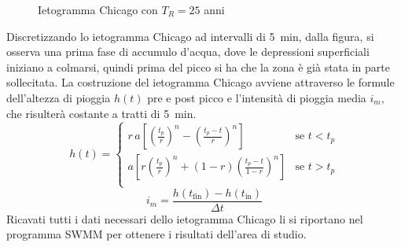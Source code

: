 \begin{figure}[htb]
    \centering
    \caption{Ietogramma Chicago con $T_R = 25$ anni}
    \label{fig:Chicago}
\end{figure}   

Discretizzando lo ietogramma Chicago ad intervalli di \SI{5}{\minute}, dalla figura, si osserva una prima fase di accumulo d'acqua, dove le depressioni superficiali iniziano a colmarsi, quindi prima del picco si ha che la zona è già stata in parte sollecitata.
La costruzione del ietogramma Chicago avviene attraverso le formule dell'altezza di pioggia $h(t)$ pre e post picco e l'intensità di pioggia media $i_m$, che risulterà costante a tratti di \SI{5}{\minute}.
\begin{equation}
\label{eq:altezza}
    h(t) = 
    \begin{cases}
        r \, a \left[ \left( \frac{t_p}{r}\right)^n - \left( \frac{t_p - t}{r}\right)^n  \right] & \text{se $t < t_p$}\\
        a \left[ r \left( \frac{t_p}{r}\right)^n + (1-r)\left( \frac{t_p - t}{1 - r}\right)^n  \right] & \text{se $t > t_p$}\\
    \end{cases}
\end{equation}
\begin{equation}
\label{eq:imedia}
    i_m = \frac{h(t_\text{fin}) - h(t_\text{in})}{\Delta t}
\end{equation}
Ricavati tutti i dati necessari dello ietogramma Chicago li si riportano nel programma SWMM per ottenere i risultati dell'area di studio.


